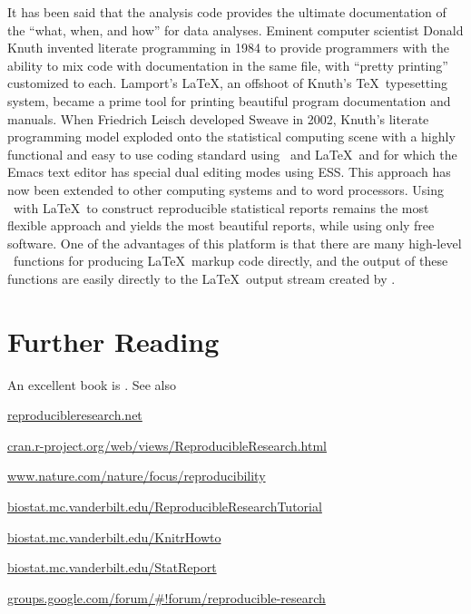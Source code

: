 {\smaller[2]
It has been said that the analysis code provides the ultimate
documentation of the ``what, when, and how'' for data analyses.  Eminent
computer scientist Donald Knuth invented literate programming in 1984
to provide programmers with the ability to mix code with documentation
in the same file, with ``pretty printing'' customized to each.
Lamport's \LaTeX, an offshoot of Knuth's \TeX\ typesetting system, became
a prime tool for printing beautiful program documentation and manuals.
When Friedrich Leisch developed Sweave in 2002, Knuth's literate
programming model exploded onto the statistical computing scene with a
highly functional and easy to use coding standard using \R\ and \LaTeX\
and for which the Emacs text editor has special dual editing modes
using ESS.  This approach has now been extended to other computing
systems and to word processors.  Using \R\ with \LaTeX\ to construct
reproducible statistical reports remains the most flexible approach
and yields the most beautiful reports, while using only free software.
One of the advantages of this platform is that there are many
high-level \R\ functions for producing \LaTeX\ markup code directly, and
the output of these functions are easily directly to the \LaTeX\ output
stream created by \co{knitr}.}

\section{Further Reading}
An excellent book is \citet{irr}.  See also
\bi
\item \url{reproducibleresearch.net}
\item \url{cran.r-project.org/web/views/ReproducibleResearch.html}
\item \url{www.nature.com/nature/focus/reproducibility}
\item \url{biostat.mc.vanderbilt.edu/ReproducibleResearchTutorial}
\item \url{biostat.mc.vanderbilt.edu/KnitrHowto}
\item \url{biostat.mc.vanderbilt.edu/StatReport}
\item \url{groups.google.com/forum/#!forum/reproducible-research}
\ei

    
